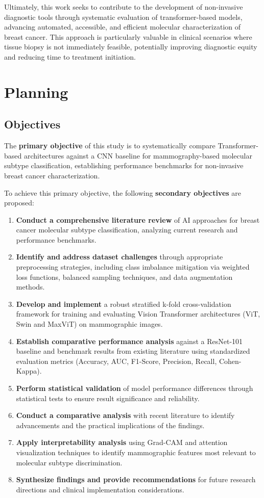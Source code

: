 \documentclass[a4paper,10pt]{book}
\begin{document}
Ultimately, this work seeks to contribute to the development of non-invasive diagnostic tools through systematic evaluation of transformer-based models, advancing automated, accessible, and efficient molecular characterization of breast cancer. This approach is particularly valuable in clinical scenarios where tissue biopsy is not immediately feasible, potentially improving diagnostic equity and reducing time to treatment initiation.


\section{Planning}

\subsection{Objectives}

The \textbf{primary objective} of this study is to systematically compare Transformer-based architectures against a CNN baseline for mammography-based molecular subtype classification, establishing performance benchmarks for non-invasive breast cancer characterization.

To achieve this primary objective, the following \textbf{secondary objectives} are proposed:

\begin{enumerate}
	\item \textbf{Conduct a comprehensive literature review} of AI approaches for breast cancer molecular subtype classification, analyzing current research and performance benchmarks.
	\item \textbf{Identify and address dataset challenges} through appropriate preprocessing strategies, including class imbalance mitigation via weighted loss functions, balanced sampling techniques, and data augmentation methods.
	\item \textbf{Develop and implement} a robust stratified k-fold cross-validation framework for training and evaluating Vision Transformer architectures (ViT, Swin and MaxViT) on mammographic images.
	\item \textbf{Establish comparative performance analysis} against a ResNet-101 baseline and benchmark results from existing literature using standardized evaluation metrics (Accuracy, AUC, F1-Score, Precision, Recall, Cohen-Kappa).
	\item \textbf{Perform statistical validation} of model performance differences through statistical tests to ensure result significance and reliability.
        \item \textbf{Conduct a comparative analysis} with recent literature to identify advancements and the practical implications of the findings.
	\item \textbf{Apply interpretability analysis} using Grad-CAM and attention visualization techniques to identify mammographic features most relevant to molecular subtype discrimination.
	\item \textbf{Synthesize findings and provide recommendations} for future research directions and clinical implementation considerations.
\end{enumerate}
\end{document}
